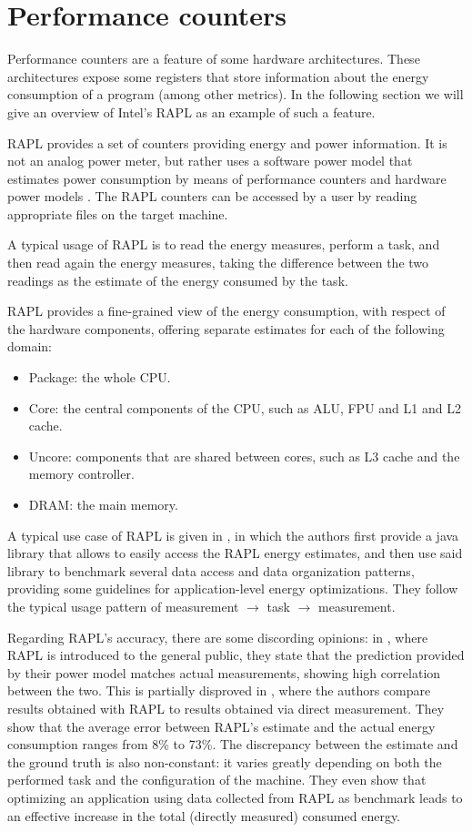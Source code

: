 \section{Performance counters}
Performance counters are a feature of some hardware architectures. These architectures expose some registers that store information about the energy consumption of a program (among other metrics). In the following section we will give an overview of Intel's RAPL as an example of such a feature.
\par RAPL provides a set of counters providing energy and power information. It is not an analog power meter, but rather uses a software power model that estimates power consumption by means of performance counters and hardware power models \cite{rapl-link}. The RAPL counters can be accessed by a user by reading appropriate files on the target machine. 
\par A typical usage of RAPL is to read the energy measures, perform a task, and then read again the energy measures, taking the difference between the two readings as the estimate of the energy consumed by the task. 
\par RAPL provides a fine-grained view of the energy consumption, with respect of the hardware components, offering separate estimates for each of the following domain:
\begin{itemize}
\item Package: the whole CPU.
\item Core: the central components of the CPU, such as ALU, FPU and L1 and L2 cache.
\item Uncore: components that are shared between cores, such as L3 cache and the memory controller.
\item DRAM: the main memory.
\end{itemize}
A typical use case of RAPL is given in \cite{jrapl}, in which the authors first provide a java library that allows to easily access the RAPL energy estimates, and then use said library to benchmark several data access and data organization patterns, providing some guidelines for application-level energy optimizations. They follow the typical usage pattern of measurement $\rightarrow$ task $\rightarrow$ measurement. 
\par Regarding RAPL's accuracy, there are some discording opinions: in \cite{rapl}, where RAPL is introduced to the general public, they state that the prediction provided by their power model matches actual measurements, showing high correlation between the two. This is partially disproved in \cite{fahad}, where the authors compare results obtained with RAPL to results obtained via direct measurement. They show that the average error between RAPL's estimate and the actual energy consumption ranges from 8\% to 73\%. The discrepancy between the estimate and the ground truth is also non-constant: it varies greatly depending on both the performed task and the configuration of the machine. They even show that optimizing an application using data collected from RAPL as benchmark leads to an effective increase in the total (directly measured) consumed energy.
